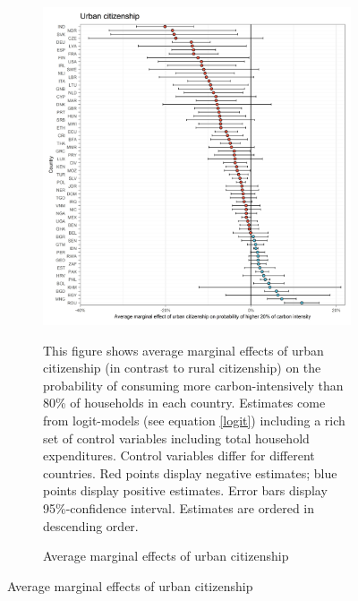 \begin{figure}[ht!]\ContinuedFloat
   \centering
   \begin{subfigure}[b]{\textwidth}
   \centering
   \caption{Average marginal effects of urban citizenship} \label{fig:Logit_ME_urban}
   \includegraphics{1_Figures/Analysis_Logit_Models_Marginal_Effects/Average_Marginal_Effects_affected_upper_80_urban_01_2017.jpg}
   \begin{subcaption2}
     This figure shows average marginal effects of urban citizenship (in contrast to rural citizenship) on the probability of consuming more carbon-intensively than 80\% of households in each country. Estimates come from logit-models (see equation \ref{logit}) including a rich set of control variables including total household expenditures. Control variables differ for different countries. Red points display negative estimates; blue points display positive estimates. Error bars display 95\%-confidence interval. Estimates are ordered in descending order.
   \end{subcaption2}
   \end{subfigure}
 \end{figure}
 \clearpage

